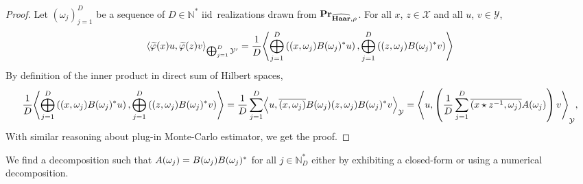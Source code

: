 \begin{proof}
    Let $(\omega_j)_{j=1}^D$ be a sequence of $D\in\mathbb{N}^*$
    \ac{iid}~realizations drawn from ${\mathbf{{Pr}}}_{\widehat{\mathbf{Haar}},\rho}$. For
    all $x$, $z \in \mathcal{X}$ and all $u$, $v \in \mathcal{Y}$,
    \begin{dmath*}
        \inner*{\tildePhi{\omega}(x)u,\tildePhi{\omega}(z)v}_{\Vect_{j=1}^D
        \mathcal{Y}'}
        =\frac{1}{D}\inner*{\Vect_{j=1}^D \left(\pairing{x,
        \omega_j}B(\omega_j)^\adjoint u\right), \Vect_{j=1}^D\left(\pairing{z,
        \omega_j}B(\omega_j)^\adjoint v\right)}
    \end{dmath*}
    By definition of the inner product in direct sum of Hilbert spaces, 
    \begin{dmath*}
        \frac{1}{D}\inner*{\Vect_{j=1}^D \left(\pairing{x,
        \omega_j}B(\omega_j)^\adjoint u\right), \Vect_{j=1}^D\left(\pairing{z,
        \omega_j}B(\omega_j)^\adjoint v\right)} 
        = \frac{1}{D} \sum_{j=1}^D \inner*{u, \conj{\pairing{x,
        \omega_j}}B(\omega_j)\pairing{z, \omega_j}B(\omega_j)^\adjoint
        v}_{\mathcal{Y}}
        = \inner*{u, \left(\frac{1}{D} \sum_{j=1}^D \conj{\pairing{x\groupop
        \inv{z}, \omega_j}}A(\omega_j)\right)v}_{\mathcal{Y}},
    \end{dmath*}
    With similar reasoning about plug-in Monte-Carlo estimator, we get the
    proof.
\end{proof}
\begin{remark}
    We find a decomposition such that
    $A(\omega_j)=B(\omega_j)B(\omega_j)^* $ for all $j\in\mathbb{N}^*_D$
    either by exhibiting a closed-form or using a numerical decomposition.
\end{remark}



